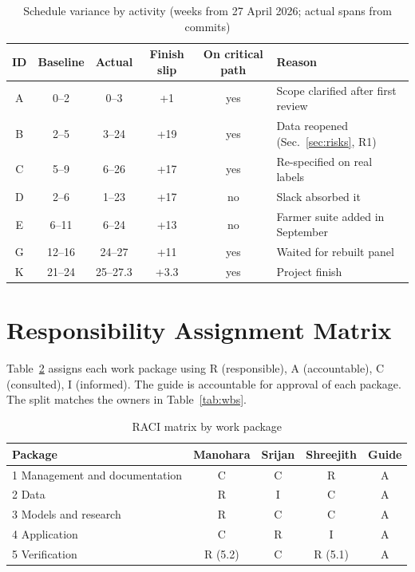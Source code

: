 \begin{table}[!t]
\centering
\caption{Schedule variance by activity (weeks from 27 April 2026; actual spans from commits)}
\label{tab:variance}
\small
\begin{tabular}{|c|c|c|c|c|p{4.6cm}|}
\hline
\textbf{ID} & \textbf{Baseline} & \textbf{Actual} & \textbf{Finish slip} & \textbf{On critical path} & \textbf{Reason} \\ \hline
A & 0--2 & 0--3 & +1 & yes & Scope clarified after first review \\ \hline
B & 2--5 & 3--24 & +19 & yes & Data reopened (Sec.~\ref{sec:risks}, R1) \\ \hline
C & 5--9 & 6--26 & +17 & yes & Re-specified on real labels \\ \hline
D & 2--6 & 1--23 & +17 & no & Slack absorbed it \\ \hline
E & 6--11 & 6--24 & +13 & no & Farmer suite added in September \\ \hline
G & 12--16 & 24--27 & +11 & yes & Waited for rebuilt panel \\ \hline
K & 21--24 & 25--27.3 & +3.3 & yes & Project finish \\ \hline
\end{tabular}
\end{table}

\section{Responsibility Assignment Matrix}
\label{sec:ram}

Table~\ref{tab:ram} assigns each work package using R (responsible), A (accountable), C (consulted), I (informed). The guide is accountable for approval of each package. The split matches the owners in Table~\ref{tab:wbs}.

\begin{table}[!t]
\centering
\caption{RACI matrix by work package}
\label{tab:ram}
\small
\begin{tabular}{|l|c|c|c|c|}
\hline
\textbf{Package} & \textbf{Manohara} & \textbf{Srijan} & \textbf{Shreejith} & \textbf{Guide} \\ \hline
1 Management and documentation & C & C & R & A \\ \hline
2 Data & R & I & C & A \\ \hline
3 Models and research & R & C & C & A \\ \hline
4 Application & C & R & I & A \\ \hline
5 Verification & R (5.2) & C & R (5.1) & A \\ \hline
\end{tabular}
\end{table}

